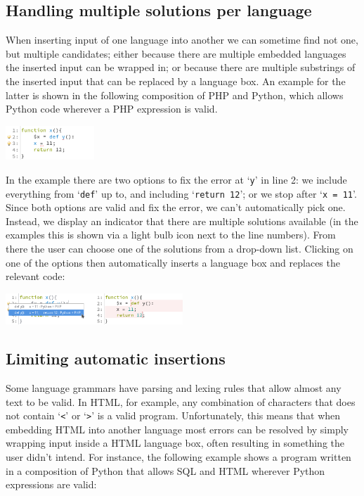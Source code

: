 \documentclass[sigplan,screen]{acmart}\settopmatter{printfolios=true,printccs=false,printacmref=false}
\newcommand{\qtt}[1]{`\texttt{#1}'\xspace}
\begin{document}
\subsection{Handling multiple solutions per language}

When inserting input of one language into another we can sometime find
not one, but multiple candidates; either because there are multiple embedded
languages the inserted input can be wrapped in; or because there are multiple
substrings of the inserted input that can be replaced by a language box.
An example for the latter is
shown in the following composition of PHP and Python, which allows Python code
wherever a PHP expression is valid.

\begin{center}
\includegraphics[width=0.25\textwidth]{images/autoboxmultioption.png}
\end{center}

In the example there are two options to fix the error at \qtt{y} in line 2:
we include everything from \qtt{def} up to,
and including \qtt{return 12}; or we stop after \qtt{x = 11}. Since both
options are valid and fix the error, we can't automatically pick one.
Instead, we display an indicator that there are multiple solutions available
(in the examples this is shown via a light bulb icon next to the line numbers). From
there the user can choose one of the solutions from a drop-down list. Clicking
on one of the options then automatically inserts a language box and replaces
the relevant code:

\begin{center}
\includegraphics[width=0.50\textwidth]{images/autoboxmultioption2.png}
\end{center}

\subsection{Limiting automatic insertions}
\label{subsec:limitingautoinserts}

Some language grammars have parsing and lexing rules that allow almost any text to be valid.
In HTML, for example, any combination of characters that does not contain
\qtt{<} or \qtt{>} is a valid program. Unfortunately, this means that when
embedding HTML into another language most errors can be resolved by simply wrapping input inside a
HTML language box, often resulting in something the user didn't intend. For
instance, the following example shows a program written in a composition of
Python that allows SQL and HTML wherever Python expressions are valid:
\end{document}
